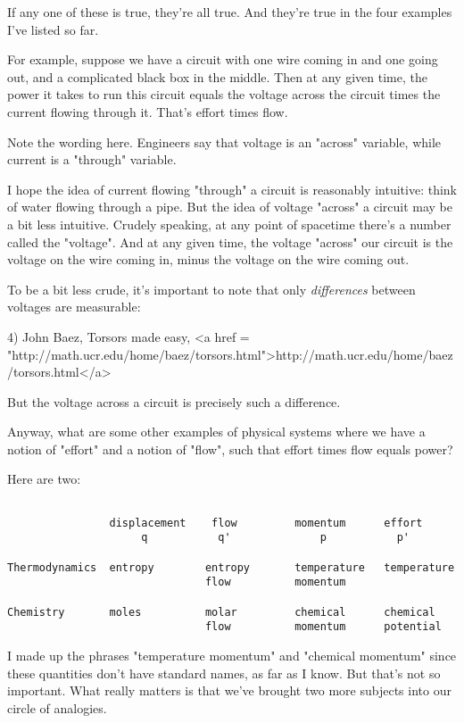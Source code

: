  If any one of these is true, they're all true.  And they're true
in the four examples I've listed so far.  

For example, suppose we have a circuit with one wire coming in and one
going out, and a complicated black box in the middle.  Then at any
given time, the power it takes to run this circuit equals the voltage
across the circuit times the current flowing through it.  That's
effort times flow.

Note the wording here.  Engineers say that voltage is an "across"
variable, while current is a "through" variable.  

I hope the idea of current flowing "through" a circuit
is reasonably intuitive: think of water flowing through a pipe.  But
the idea of voltage "across" a circuit may be a bit less
intuitive.  Crudely speaking, at any point of spacetime there's a
number called the "voltage".  And at any given time, the
voltage "across" our circuit is the voltage on the wire
coming in, minus the voltage on the wire coming out.

To be a bit less crude, it's important to note that only
\emph{differences} between voltages are measurable:

4) John Baez, Torsors made easy, <a href = "http://math.ucr.edu/home/baez/torsors.html">http://math.ucr.edu/home/baez/torsors.html</a>

But the voltage across a circuit is precisely such a difference.

Anyway, what are some other examples of physical systems where we
have a notion of "effort" and a notion of "flow",
such that effort times flow equals power?

Here are two:


\begin{verbatim}

                displacement    flow         momentum      effort
                     q           q'              p           p'

Thermodynamics  entropy        entropy       temperature   temperature
                               flow          momentum

Chemistry       moles          molar         chemical      chemical
                               flow          momentum      potential

\end{verbatim}
    

I made up the phrases "temperature momentum" and
"chemical momentum" since these quantities don't have
standard names, as far as I know.  But that's not so important.  What
really matters is that we've brought two more subjects into our circle
of analogies.

